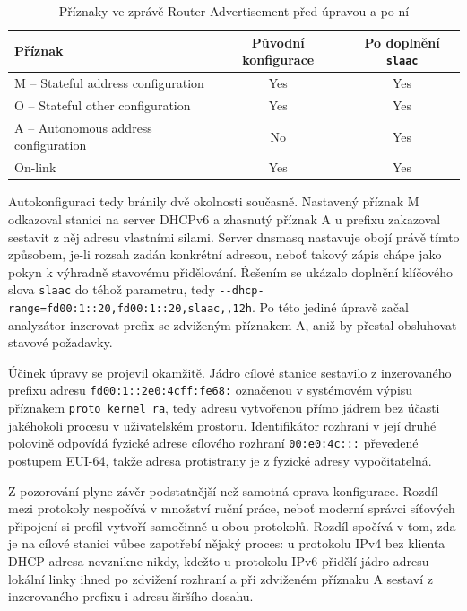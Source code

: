 \begin{table}[htbp]
    \caption{Příznaky ve zprávě Router Advertisement před úpravou a po ní}
    \label{tab:ra_flags}
    \centering
    \begin{tabular}{lcc}
        \hline
        Příznak & Původní konfigurace & Po doplnění \texttt{slaac} \\
        \hline
        M -- Stateful address configuration & Yes & Yes \\
        O -- Stateful other configuration & Yes & Yes \\
        A -- Autonomous address configuration & No & Yes \\
        On-link & Yes & Yes \\
        \hline
    \end{tabular}
\end{table}

Autokonfiguraci tedy bránily dvě okolnosti současně. Nastavený příznak M odkazoval stanici na server DHCPv6 a zhasnutý příznak A u prefixu zakazoval sestavit z něj adresu vlastními silami. Server dnsmasq nastavuje obojí právě tímto způsobem, je-li rozsah zadán konkrétní adresou, neboť takový zápis chápe jako pokyn k výhradně stavovému přidělování. Řešením se ukázalo doplnění klíčového slova \texttt{slaac} do téhož parametru, tedy \texttt{-{}-dhcp-range=\allowbreak fd00:1::20,\allowbreak fd00:1::20,\allowbreak slaac,,\allowbreak 12h}. Po této jediné úpravě začal analyzátor inzerovat prefix se zdviženým příznakem A, aniž by přestal obsluhovat stavové požadavky.

Účinek úpravy se projevil okamžitě. Jádro cílové stanice sestavilo z inzerovaného prefixu adresu \texttt{fd00:1::\allowbreak 2e0:\allowbreak 4cff:\allowbreak fe68:} označenou v systémovém výpisu příznakem \texttt{proto kernel\_ra}, tedy adresu vytvořenou přímo jádrem bez účasti jakéhokoli procesu v uživatelském prostoru. Identifikátor rozhraní v její druhé polovině odpovídá fyzické adrese cílového rozhraní \texttt{00:\allowbreak e0:\allowbreak 4c:::} převedené postupem EUI-64, takže adresa protistrany je z fyzické adresy vypočitatelná.

Z pozorování plyne závěr podstatnější než samotná oprava konfigurace. Rozdíl mezi protokoly nespočívá v množství ruční práce, neboť moderní správci síťových připojení si profil vytvoří samočinně u obou protokolů. Rozdíl spočívá v tom, zda je na cílové stanici vůbec zapotřebí nějaký proces: u protokolu IPv4 bez klienta DHCP adresa nevznikne nikdy, kdežto u protokolu IPv6 přidělí jádro adresu lokální linky ihned po zdvižení rozhraní a při zdviženém příznaku A sestaví z inzerovaného prefixu i adresu širšího dosahu.


